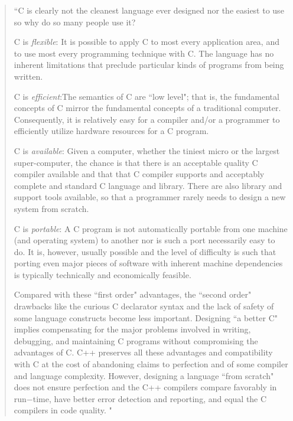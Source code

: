 \begin{quote}
\label{q:StroustrupCvsOther}
``C is clearly not the cleanest language ever designed nor the easiest to use so why do so many people use it?
\begin{enumerate}[label = {[\arabic*]}]
\item C is \textit{flexible}: It is possible to apply C to most every application area, and to use most every programming technique with C.  The language has no inherent limitations that preclude particular kinds of programs from being written.
\item C is \textit{efficient}:The semantics of C are ``low level"; that is, the fundamental concepts of C mirror the fundamental concepts of a traditional computer.  Consequently, it is relatively easy for a compiler and/or a programmer to efficiently utilize hardware resources for a C program.
\item C is \textit{available}: Given a computer, whether the tiniest micro or the largest super-computer, the chance is that there is an acceptable quality C compiler available and that that C compiler supports and acceptably complete and standard C language and library.  There are also library and support tools available, so that a programmer rarely needs to design a new system from scratch.
\item C is \textit{portable}: A C program is not automatically portable from one machine (and operating system) to another nor is such a port necessarily easy to do.  It is, however, usually possible and the level of difficulty is such that porting even major pieces of software with inherent machine dependencies is typically technically and economically feasible.
\end{enumerate}
Compared with these ``first order" advantages, the ``second order" drawbacks like the curious C declarator syntax and the lack of safety of some language constructs become less important. Designing ``a better C" implies compensating for the major problems involved in writing, debugging, and maintaining C programs without compromising the advantages of C. C++ preserves all these advantages and compatibility with C at the cost of abandoning claims to perfection and of some compiler and language complexity. However, designing a language ``from scratch" does not ensure perfection and the C++ compilers compare favorably in run−time, have better error detection and reporting, and equal the C compilers in code quality. \cite{stroustrup1996history}"
\end{quote}

